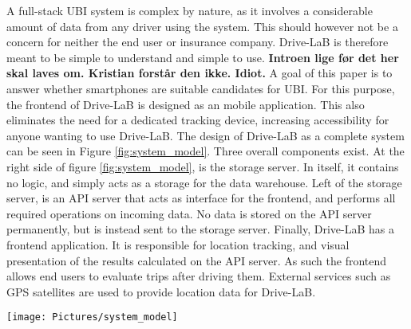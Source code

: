 A full-stack UBI system is complex by nature, as it involves a considerable amount of data from any driver using the system. This should however not be a concern for neither the end user or insurance company. Drive-LaB is therefore meant to be simple to understand and simple to use. \textbf{Introen lige før det her skal laves om. Kristian forstår den ikke. Idiot.}
A goal of this paper is to answer whether smartphones are suitable candidates for UBI. For this purpose, the frontend of Drive-LaB is designed as an mobile application. This also eliminates the need for a dedicated tracking device, increasing accessibility for anyone wanting to use Drive-LaB.
The design of Drive-LaB as a complete system can be seen in Figure \ref{fig:system_model}. Three overall components exist. At the right side of figure \ref{fig:system_model}, is the storage server. In itself, it contains no logic, and simply acts as a storage for the data warehouse. Left of the storage server, is an API server that acts as interface for the frontend, and performs all required operations on incoming data. No data is stored on the API server permanently, but is instead sent to the storage server. Finally, Drive-LaB has a frontend application. It is responsible for location tracking, and visual presentation of the results calculated on the API server. As such the frontend allows end users to evaluate trips after driving them. External services such as GPS satellites are used to provide location data for Drive-LaB.

\begin{figure*}[tb]
\centering
\texttt{[image: Pictures/system\_model]}
\caption{Composition of the system}
\label{fig:system_model}
\end{figure*}